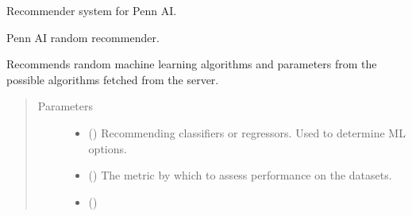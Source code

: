 \documentclass[letterpaper,10pt,english]{sphinxmanual}
\begin{document}
\label{\detokenize{index:module-ai.recommender.random_recommender}}
Recommender system for Penn AI.

\begin{fulllineitems}
\label{\detokenize{index:ai.recommender.random_recommender.RandomRecommender}}
Penn AI random recommender.

Recommends random machine learning algorithms and parameters from the possible algorithms
fetched from the server.
\begin{quote}\begin{description}
\item[{Parameters}] \leavevmode\begin{itemize}
\item {} 
 (\sphinxstyleliteralemphasis{\sphinxupquote{, }}) \textendash{} Recommending classifiers or regressors. Used to determine ML options.

\item {} 
 (\sphinxstyleliteralemphasis{\sphinxupquote{ (}}\sphinxstyleliteralemphasis{\sphinxupquote{, }}\sphinxstyleliteralemphasis{\sphinxupquote{)}}) \textendash{} The metric by which to assess performance on the datasets.

\item {} 
 () \textendash{} 

\end{itemize}

\end{description}\end{quote}


\end{fulllineitems}
\end{document}
